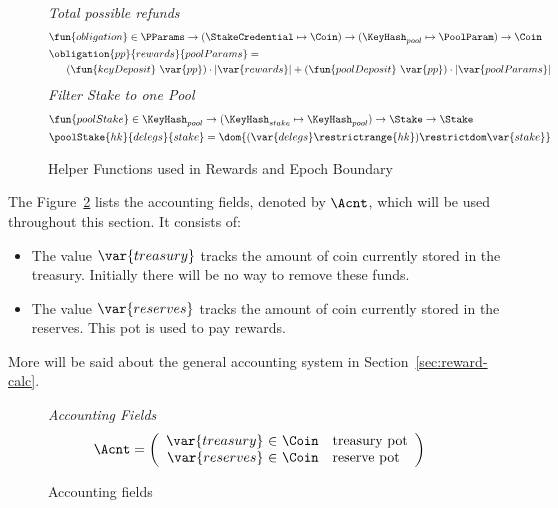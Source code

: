 \begin{figure}[htb]
  \emph{Total possible refunds}
  \begin{align*}
    & \fun{obligation} \in \PParams \to (\StakeCredential \mapsto \Coin)
    \to (\KeyHash_{pool}\mapsto\PoolParam) \to \Coin \\
    & \obligation{pp}{rewards}{poolParams} = \\
    & ~~~~~
    (\fun{keyDeposit}~\var{pp}) \cdot|\var{rewards}| +
    (\fun{poolDeposit}~\var{pp}) \cdot|\var{poolParams}| \\
  \end{align*}
  \emph{Filter Stake to one Pool}
  \begin{align*}
      & \fun{poolStake} \in \KeyHash_{pool} \to (\KeyHash_{stake} \mapsto \KeyHash_{pool})
        \to \Stake \to \Stake \\
      & \poolStake{hk}{delegs}{stake} =
        \dom{(\var{delegs}\restrictrange\{hk\})\restrictdom\var{stake}}
  \end{align*}

  \caption{Helper Functions used in Rewards and Epoch Boundary}
  \label{fig:funcs:epoch-helper-rewards}
\end{figure}


The Figure~\ref{fig:defs:accounting} lists the accounting fields, denoted by $\Acnt$,
which will be used throughout this section. It consists of:
\begin{itemize}
  \item The value $\var{treasury}$ tracks the amount of coin currently stored in the treasury.
    Initially there will be no way to remove these funds.
  \item The value $\var{reserves}$ tracks the amount of coin currently stored in the reserves.
    This pot is used to pay rewards.
\end{itemize}
More will be said about the general accounting system in Section~\ref{sec:reward-calc}.

\begin{figure}[htb]
  \emph{Accounting Fields}
  \begin{equation*}
    \Acnt =
    \left(
      \begin{array}{r@{~\in~}ll}
        \var{treasury} & \Coin & \text{treasury pot}\\
        \var{reserves} & \Coin & \text{reserve pot}\\
      \end{array}
    \right)
  \end{equation*}
  \caption{Accounting fields}
  \label{fig:defs:accounting}
\end{figure}



